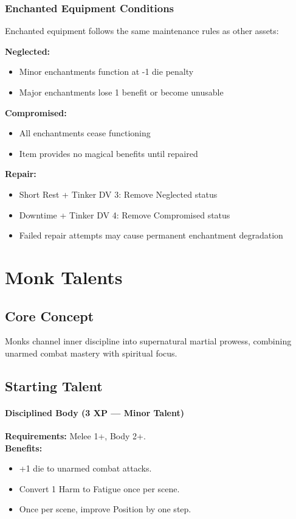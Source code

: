\subsubsection{Enchanted Equipment Conditions}

Enchanted equipment follows the same maintenance rules as other assets:

\textbf{Neglected:}
\begin{itemize}
\item Minor enchantments function at -1 die penalty
\item Major enchantments lose 1 benefit or become unusable
\end{itemize}

\textbf{Compromised:}
\begin{itemize}
\item All enchantments cease functioning
\item Item provides no magical benefits until repaired
\end{itemize}

\textbf{Repair:}
\begin{itemize}
\item Short Rest + Tinker DV 3: Remove Neglected status
\item Downtime + Tinker DV 4: Remove Compromised status
\item Failed repair attempts may cause permanent enchantment degradation
\end{itemize}

\section{Monk Talents}
\label{sec:monk-talents}

\subsection*{Core Concept}
Monks channel inner discipline into supernatural martial prowess, combining unarmed combat mastery with spiritual focus.

\subsection*{Starting Talent}
\paragraph{Disciplined Body (3 XP --- Minor Talent)} 
\textbf{Requirements:} Melee 1+, Body 2+. \\
\textbf{Benefits:}
\begin{itemize}
  \item +1 die to unarmed combat attacks.
  \item Convert 1 Harm to Fatigue once per scene.
  \item Once per scene, improve Position by one step.
\end{itemize}

